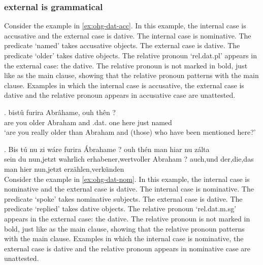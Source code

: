   \subsubsection{external is grammatical}


Consider the example in \ref{ex:ohg-dat-acc}. In this example, the internal case is accusative and the external case is dative.
The internal case is nominative. The predicate  `named' takes accusative objects.
The external case is dative. The predicate  `older' takes dative objects.
The relative pronoun  `\ac{rel}.\ac{dat}.\ac{pl}' appears in the external case: the dative. The relative pronoun is not marked in bold, just like as the main clause, showing that the relative pronoun patterns with the main clause.
Examples in which the internal case is accusative, the external case is dative and the relative pronoun appears in accusative case are unattested.

\exg. bistû furira Abrâhame, ouh thên    ?\\
 {are you} older\scsub{[dat]} {Abraham} and .\ac{dat}. one here just named\scsub{[acc]}\\
 `are you really older than Abraham and (those) who have been mentioned here?' \label{ex:ohg-dat-acc}

\exg. Bis	tú	nu	{zi wáre}	furira	Ábrahame	?	ouh	thén	man	hiar	nu	zálta\\
sein	du	nun,jetzt	wahrlich	erhabener,wertvoller	Abraham	?	auch,und	der,die,das	man	hier	nun,jetzt	erzählen,verkünden\\



Consider the example in \ref{ex:ohg-dat-nom}. In this example, the internal case is nominative and the external case is dative.
The internal case is nominative. The predicate  `spoke' takes nominative subjects.
The external case is dative. The predicate  `replied' takes dative objects.
The relative pronoun  `\ac{rel}.\ac{dat}.\ac{m}.\ac{sg}' appears in the external case: the dative. The relative pronoun is not marked in bold, just like as the main clause, showing that the relative pronoun patterns with the main clause.
Examples in which the internal case is nominative, the external case is dative and the relative pronoun appears in nominative case are unattested.

